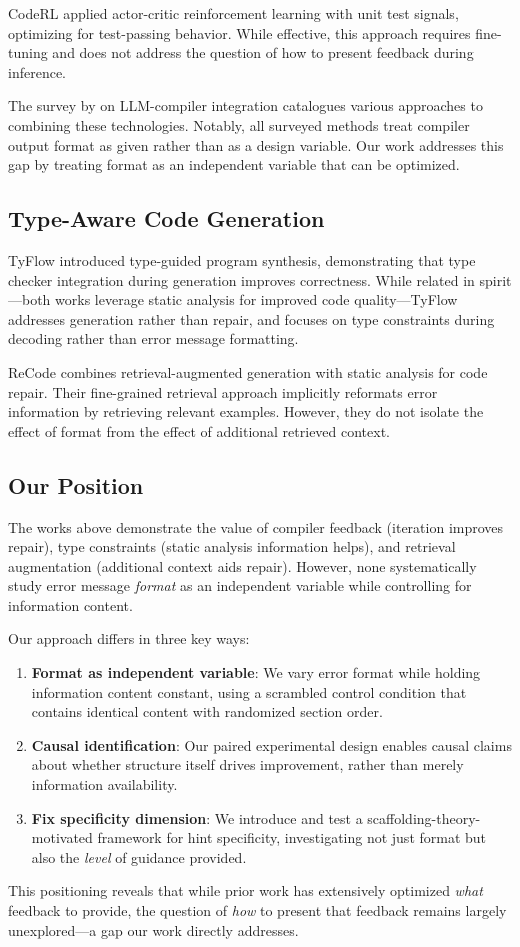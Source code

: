 CodeRL \citep{shojaee2023coderl} applied actor-critic reinforcement learning with unit test signals, optimizing for test-passing behavior. While effective, this approach requires fine-tuning and does not address the question of how to present feedback during inference.

The survey by \citet{compilerstack2025} on LLM-compiler integration catalogues various approaches to combining these technologies. Notably, all surveyed methods treat compiler output format as given rather than as a design variable. Our work addresses this gap by treating format as an independent variable that can be optimized.

\subsection{Type-Aware Code Generation}

TyFlow \citep{tyflow2025} introduced type-guided program synthesis, demonstrating that type checker integration during generation improves correctness. While related in spirit---both works leverage static analysis for improved code quality---TyFlow addresses generation rather than repair, and focuses on type constraints during decoding rather than error message formatting.

ReCode \citep{recode2025} combines retrieval-augmented generation with static analysis for code repair. Their fine-grained retrieval approach implicitly reformats error information by retrieving relevant examples. However, they do not isolate the effect of format from the effect of additional retrieved context.

\subsection{Our Position}

The works above demonstrate the value of compiler feedback (iteration improves repair), type constraints (static analysis information helps), and retrieval augmentation (additional context aids repair). However, none systematically study error message \emph{format} as an independent variable while controlling for information content.

Our approach differs in three key ways:

\begin{enumerate}
    \item \textbf{Format as independent variable}: We vary error format while holding information content constant, using a scrambled control condition that contains identical content with randomized section order.

    \item \textbf{Causal identification}: Our paired experimental design enables causal claims about whether structure itself drives improvement, rather than merely information availability.

    \item \textbf{Fix specificity dimension}: We introduce and test a scaffolding-theory-motivated framework for hint specificity, investigating not just format but also the \emph{level} of guidance provided.
\end{enumerate}

This positioning reveals that while prior work has extensively optimized \emph{what} feedback to provide, the question of \emph{how} to present that feedback remains largely unexplored---a gap our work directly addresses.
